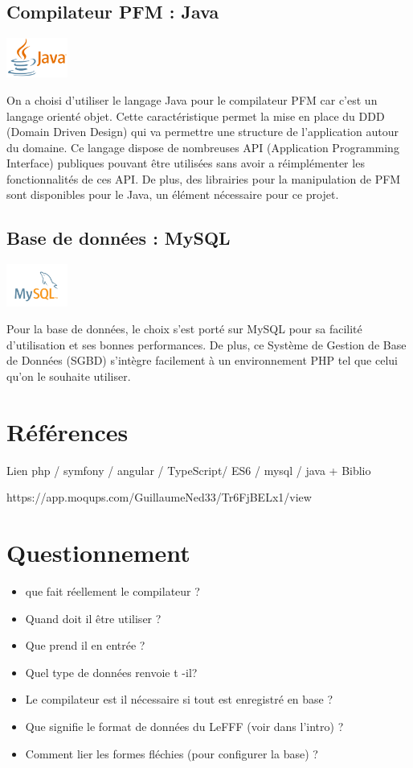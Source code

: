 \documentclass[12pt,a4paper]{article}
\begin{document}
\subsection{Compilateur PFM : Java}
\begin{center}
  \includegraphics[width=2cm]{img/java.png}
\end{center}
On a choisi d'utiliser le langage Java pour le compilateur PFM car c'est un langage orienté objet. 
Cette caractéristique permet la mise en place du DDD (Domain Driven Design) qui va permettre une structure de l'application autour du domaine.
Ce langage dispose de nombreuses API (Application Programming Interface) publiques pouvant être utilisées sans avoir a réimplémenter les fonctionnalités de ces API. 
De plus, des librairies pour la manipulation de PFM sont disponibles pour le Java, un élément nécessaire pour ce projet.

\subsection{Base de données : MySQL}
\begin{center}
  \includegraphics[width=2cm]{img/mysql.png}
\end{center}
Pour la base de données, le choix s'est porté sur MySQL pour sa facilité d'utilisation et ses bonnes performances. 
De plus, ce Système de Gestion de Base de Données (SGBD) s'intègre facilement à un environnement PHP tel que celui qu'on le souhaite utiliser.

\section{Références}
Lien php / symfony / angular / TypeScript/ ES6 / mysql / java
+ Biblio

https://app.moqups.com/GuillaumeNed33/Tr6FjBELx1/view
 

\section{Questionnement}
\begin{itemize}  
  \item que fait réellement le compilateur ?
  \item Quand doit il être utiliser ?
  \item Que prend il en entrée ?
  \item Quel type de données renvoie t -il?
  \item Le compilateur est il nécessaire si tout est enregistré en base ?
  \item Que signifie le format de données du LeFFF (voir dans l'intro) ?
  \item Comment lier les formes fléchies (pour configurer la base) ?
\end{itemize}
\end{document}

